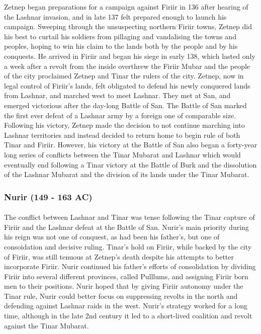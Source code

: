 					Zetnep began preparations for a campaign against Firiir in 136 after hearing of the Lashnar invasion, and in late 137 felt prepared enough to launch his campaign. Sweeping through the unsuspecting northern Firiir towns, Zetnep did his best to curtail his soldiers from pillaging and vandalising the towns and peoples, hoping to win his claim to the lands both by the people and by his conquests. He arrived in Firiir and began his siege in early 138, which lasted only a week after a revolt from the inside overthrew the Firiir Mubar and the people of the city proclaimed Zetnep and Tinar the rulers of the city. Zetnep, now in legal control of Firiir's lands, felt obligated to defend his newly conquered lands from Lashnar, and marched west to meet Lashnar. They met at San, and emerged victorious after the day-long Battle of San. The Battle of San marked the first ever defeat of a Lashnar army by a foreign one of comparable size. Following his victory, Zetnep made the decision to not continue marching into Lashnar territories and instead decided to return home to begin rule of both Tinar and Firiir. However, his victory at the Battle of San also began a forty-year long series of conflicts between the Tinar Mubarat and Lashnar which would eventually end following a Tinar victory at the Battle of Burk and the dissolution of the Lashnar Mubarat and the division of its lands under the Tinar Mubarat.
			\subsubsection{Nurir (149 - 163 AC)}
				\paragraph{}
					The conflict between Lashnar and Tinar was tense following the Tinar capture of Firiir and the Lashnar defeat at the Battle of San. Nurir's main priority during his reign was not one of conquest, as had been his father's, but one of consoidation and decisive ruling. Tinar's hold on Firiir, while backed by the city of Firiir, was still tenuous at Zetnep's death despite his attempts to better incorporate Firiir. Nurir continued his father's efforts of consolidation by dividing Firiir into several different provinces, called Pulllums, and assigning Firiir born men to their positions. Nurir hoped that by giving Firiir autonomy under the Tinar rule, Nurir could better focus on suppressing revolts in the north and defending against Lashnar raids in the west. Nurir's strategy worked for a long time, although in the late 2nd century it led to a short-lived coalition and revolt against the Tinar Mubarat. 
					
